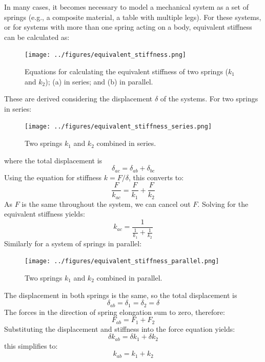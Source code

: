 \documentclass[12pt,letter]{article}
\numberwithin{ex}{section} %
\numberwithin{re}{section} %
\numberwithin{vcs}{section} %
\begin{document}
			In many cases, it becomes necessary to model a mechanical system as a set of springs (e.g., a composite material, a table with multiple legs).  For these systems, or for systems with more than one spring acting on a body, equivalent stiffness can be calculated as:
			\begin{figure}[H]
				\centering
				\texttt{[image: ../figures/equivalent\_stiffness.png]}
				\caption{Equations for calculating the equivalent stiffness of two springs ($k_1$ and $k_2$); (a) in series; and (b) in parallel.}
			\end{figure}	
			These are derived considering the displacement $\delta$ of the systems. For two springs in series:
			\begin{figure}[H]
				\centering
				\texttt{[image: ../figures/equivalent\_stiffness\_series.png]}
				\caption{Two springs $k_1$ and $k_2$ combined in series.}
			\end{figure}			
			\noindent where the total displacement is 
			\begin{equation}
				\delta_{ac} = \delta_{ab} + \delta_{bc}
			\end{equation}
			Using the equation for stiffness $k=F/\delta$, this converts to:
			\begin{equation}
				\frac{F}{k_{ac}} = \frac{F}{k_{1}} + \frac{F}{k_{2}}
			\end{equation}
			As $F$ is the same throughout the system, we can cancel out $F$. Solving for the equivalent stiffness yields:
			\begin{equation}
				k_{ac} = \frac{1}{\frac{1}{k_1}+\frac{1}{k_2}}
			\end{equation}
			Similarly for a system of springs in parallel:
			\begin{figure}[H]
				\centering
				\texttt{[image: ../figures/equivalent\_stiffness\_parallel.png]}
				\caption{Two springs $k_1$ and $k_2$ combined in parallel.}				
			\end{figure}			
			\noindent The displacement in both springs is the same, so the total displacement is 
			\begin{equation}
				\delta_{ab} = \delta_{\text{1}} =  \delta_{\text{2}} = \delta
			\end{equation}
			The forces in the direction of spring elongation sum to zero, therefore:
			\begin{equation}
				F_{ab} = F_{\text{1}} +  F_{\text{2}}
			\end{equation}			
			Substituting the displacement and stiffness into the force equation yields:
			\begin{equation}
				\delta k_{ab} = 	\delta k_{1} +  \delta k_{2}
			\end{equation}				
			this simplifies to:
			\begin{equation}
				k_{ab} = k_1+k_2
			\end{equation}
			
\end{document}
